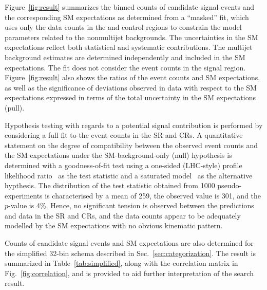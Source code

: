 Figure~\ref{fig:result} summarizes the binned counts of candidate
signal events and the corresponding SM expectations as determined from
a ``masked'' fit, which uses only the data counts in the \mj and \mmj
control regions to constrain the model parameters related to the
nonmultijet backgrounds. The uncertainties in the SM expectations
reflect both statistical and systematic contributions. The multijet
background estimates are determined independently and included in the
SM expectations. The fit does not consider the event counts in the
signal region. Figure~\ref{fig:result} also shows the ratios of the
event counts and SM expectations, as well as the significance of
deviations observed in data with respect to the SM expectations
expressed in terms of the total uncertainty in the SM expectations
(pull). 

Hypothesis testing with regards to a potential signal contribution is
performed by considering a full fit to the event counts in the SR and
CRs. A quantitative statement on the degree of compatibility between
the observed event counts and the SM expectations under the
SM-background-only (null) hypothesis is determined with a
goodness-of-fit test using a one-sided (LHC-style) profile likelihood
ratio~\cite{CMS-NOTE-2011-005} as the test statistic and a saturated
model~\cite{sat-llk} as the alternative hypthesis. The distribution of
the test statistic obtained from 1000 pseudo-experiments is
characterised by a mean of 259, the observed value is 301, and the
$p$-value is 4\%. Hence, no significant tension is observed between
the predictions and data in the SR and CRs, and the data counts appear
to be adequately modelled by the SM expectations with no obvious
kinematic pattern.

Counts of candidate signal events and SM expectations are also
determined for the simplified 32-bin schema described in
Sec.~\ref{sec:categorization}. The result is summarized in
Table~\ref{tab:simplified}, along with the correlation matrix in
Fig.~\ref{fig:correlation}, and is provided to aid further
interpretation of the search result.

